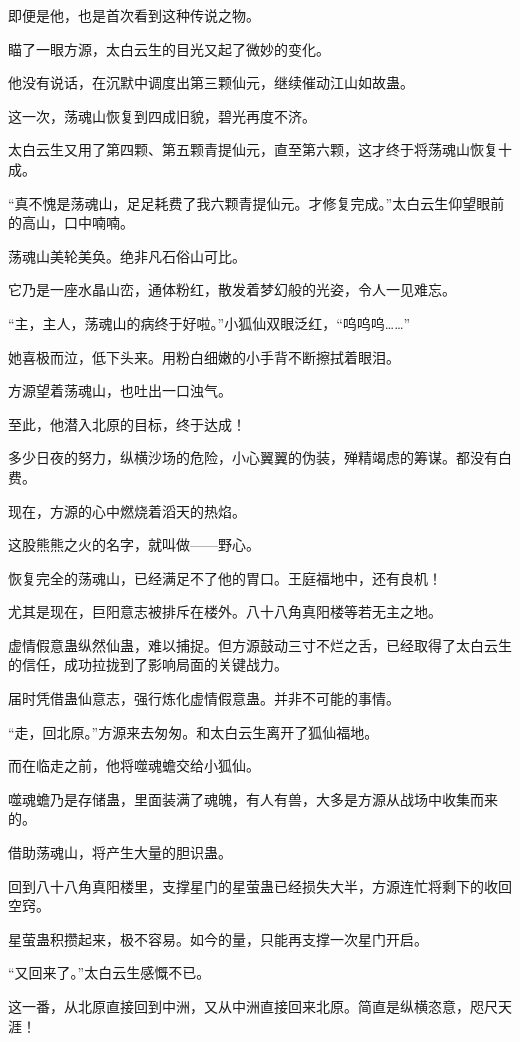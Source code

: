 \begin{this_body}
即便是他，也是首次看到这种传说之物。

瞄了一眼方源，太白云生的目光又起了微妙的变化。

他没有说话，在沉默中调度出第三颗仙元，继续催动江山如故蛊。

这一次，荡魂山恢复到四成旧貌，碧光再度不济。

太白云生又用了第四颗、第五颗青提仙元，直至第六颗，这才终于将荡魂山恢复十成。

“真不愧是荡魂山，足足耗费了我六颗青提仙元。才修复完成。”太白云生仰望眼前的高山，口中喃喃。

荡魂山美轮美奂。绝非凡石俗山可比。

它乃是一座水晶山峦，通体粉红，散发着梦幻般的光姿，令人一见难忘。

“主，主人，荡魂山的病终于好啦。”小狐仙双眼泛红，“呜呜呜……”

她喜极而泣，低下头来。用粉白细嫩的小手背不断擦拭着眼泪。

方源望着荡魂山，也吐出一口浊气。

至此，他潜入北原的目标，终于达成！

多少日夜的努力，纵横沙场的危险，小心翼翼的伪装，殚精竭虑的筹谋。都没有白费。

现在，方源的心中燃烧着滔天的热焰。

这股熊熊之火的名字，就叫做——野心。

恢复完全的荡魂山，已经满足不了他的胃口。王庭福地中，还有良机！

尤其是现在，巨阳意志被排斥在楼外。八十八角真阳楼等若无主之地。

虚情假意蛊纵然仙蛊，难以捕捉。但方源鼓动三寸不烂之舌，已经取得了太白云生的信任，成功拉拢到了影响局面的关键战力。

届时凭借蛊仙意志，强行炼化虚情假意蛊。并非不可能的事情。

“走，回北原。”方源来去匆匆。和太白云生离开了狐仙福地。

而在临走之前，他将噬魂蟾交给小狐仙。

噬魂蟾乃是存储蛊，里面装满了魂魄，有人有兽，大多是方源从战场中收集而来的。

借助荡魂山，将产生大量的胆识蛊。

回到八十八角真阳楼里，支撑星门的星萤蛊已经损失大半，方源连忙将剩下的收回空窍。

星萤蛊积攒起来，极不容易。如今的量，只能再支撑一次星门开启。

“又回来了。”太白云生感慨不已。

这一番，从北原直接回到中洲，又从中洲直接回来北原。简直是纵横恣意，咫尺天涯！


\end{this_body}

